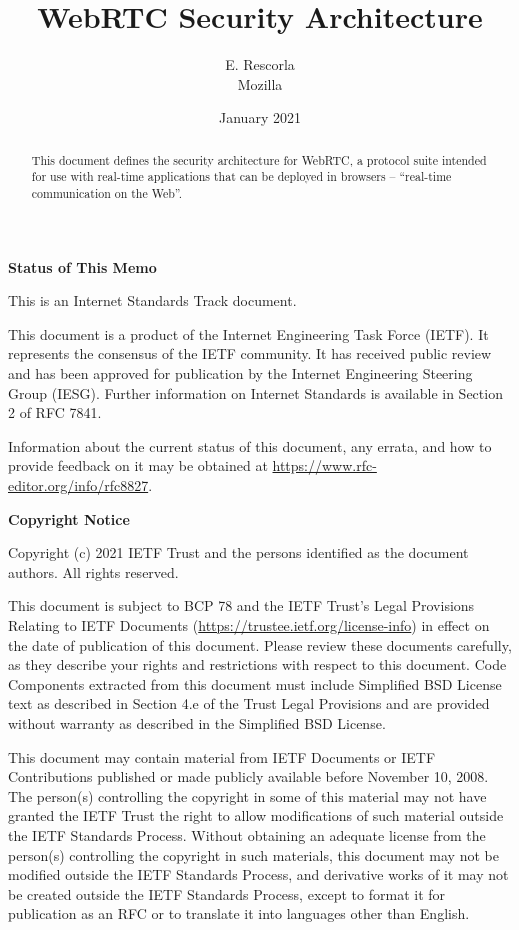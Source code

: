 \documentclass{article}
\title{WebRTC Security Architecture}
\author{E. Rescorla \\ Mozilla}
\date{January 2021}
\begin{document}
\maketitle

\begin{abstract}
This document defines the security architecture for WebRTC, a
protocol suite intended for use with real-time applications that can
be deployed in browsers -- ``real-time communication on the Web''.
\end{abstract}

\noindent\textbf{Status of This Memo}

This is an Internet Standards Track document.

This document is a product of the Internet Engineering Task Force
(IETF).  It represents the consensus of the IETF community.  It has
received public review and has been approved for publication by the
Internet Engineering Steering Group (IESG).  Further information on
Internet Standards is available in Section 2 of RFC 7841.

Information about the current status of this document, any errata,
and how to provide feedback on it may be obtained at
\url{https://www.rfc-editor.org/info/rfc8827}.

\bigskip
\noindent\textbf{Copyright Notice}

Copyright (c) 2021 IETF Trust and the persons identified as the
document authors.  All rights reserved.

This document is subject to BCP 78 and the IETF Trust's Legal
Provisions Relating to IETF Documents
(\url{https://trustee.ietf.org/license-info}) in effect on the date of
publication of this document.  Please review these documents
carefully, as they describe your rights and restrictions with respect
to this document.  Code Components extracted from this document must
include Simplified BSD License text as described in Section 4.e of
the Trust Legal Provisions and are provided without warranty as
described in the Simplified BSD License.

This document may contain material from IETF Documents or IETF
Contributions published or made publicly available before November
10, 2008.  The person(s) controlling the copyright in some of this
material may not have granted the IETF Trust the right to allow
modifications of such material outside the IETF Standards Process.
Without obtaining an adequate license from the person(s) controlling
the copyright in such materials, this document may not be modified
outside the IETF Standards Process, and derivative works of it may
not be created outside the IETF Standards Process, except to format
it for publication as an RFC or to translate it into languages other
than English.
\end{document}
